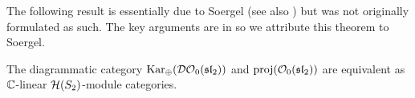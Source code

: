 


 The following result is essentially due to Soergel \cite[Endomorhihsmensatz 7, Struktursatz 9 and Section 2.4]{soergel-category-O} (see also \cite{soergel-combinatorics-of-hcbim}) but was not originally formulated as such. The key arguments are in \cite{soergel-category-O} so we attribute this theorem to Soergel.

\begin{theorem}
    The diagrammatic category $\operatorname{Kar_\oplus}(\mathcal{DO}_0(\operatorname{\mathfrak{sl}}_2))$ and $\operatorname{proj}(\mathcal{O}_0(\operatorname{\mathfrak{sl}}_2))$ are equivalent as $\mathbb{C}$-linear $\mathcal{H}(S_2)$-module categories.
\end{theorem}


